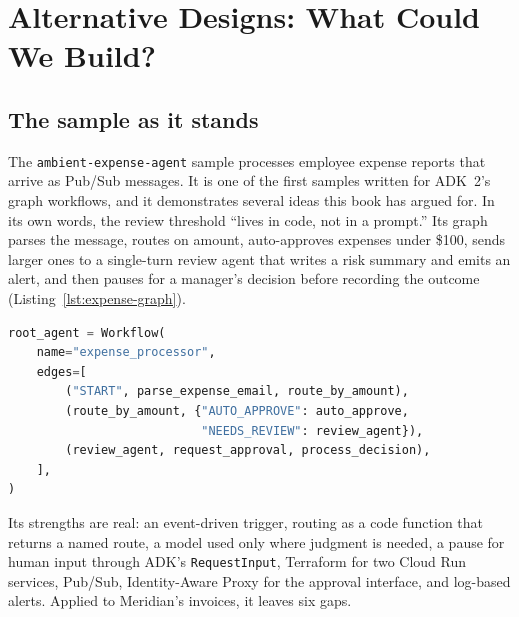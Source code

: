 \section{Alternative Designs: What Could We Build?}
\label{sec:inv-designs}

\subsection{The sample as it stands}

The \texttt{ambient-expense-agent} sample processes employee expense reports that arrive as Pub/Sub messages. It is one of the first samples written for ADK~2's graph workflows, and it demonstrates several ideas this book has argued for. In its own words, the review threshold ``lives in code, not in a prompt.'' Its graph parses the message, routes on amount, auto-approves expenses under \$100, sends larger ones to a single-turn review agent that writes a risk summary and emits an alert, and then pauses for a manager's decision before recording the outcome (Listing~\ref{lst:expense-graph}).

\begin{lstlisting}[language=Python, caption={The sample's workflow graph (from \texttt{expense\_agent/agent.py} at commit \texttt{1b20a7a}).}, label={lst:expense-graph}]
root_agent = Workflow(
    name="expense_processor",
    edges=[
        ("START", parse_expense_email, route_by_amount),
        (route_by_amount, {"AUTO_APPROVE": auto_approve,
                           "NEEDS_REVIEW": review_agent}),
        (review_agent, request_approval, process_decision),
    ],
)
\end{lstlisting}

Its strengths are real: an event-driven trigger, routing as a code function that returns a named route, a model used only where judgment is needed, a pause for human input through ADK's \texttt{RequestInput}, Terraform for two Cloud Run services, Pub/Sub, Identity-Aware Proxy for the approval interface, and log-based alerts. Applied to Meridian's invoices, it leaves six gaps.


